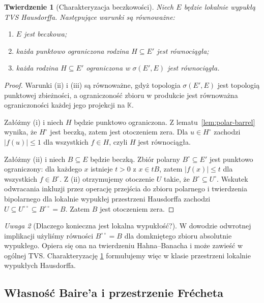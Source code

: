 \documentclass[11pt,a4paper]{article}
\numberwithin{equation}{section}
\theoremstyle{plain}
\newtheorem{twierdzenie}{Twierdzenie}[section]
\theoremstyle{definition}
\theoremstyle{remark}
\newtheorem{uwaga}[twierdzenie]{Uwaga}
\newcommand{\K}{\mathbb K}
\begin{document}
\begin{twierdzenie}[Charakteryzacja beczkowości]\label{thm:barrelled-char}
Niech $E$ będzie lokalnie wypukłą TVS Hausdorffa.
Następujące warunki są równoważne:
\begin{enumerate}[label=\textup{(\roman*)}]
\item $E$ jest beczkowa;
\item każda punktowo ograniczona rodzina $H\subseteq E'$
      jest równociągła;
\item każda rodzina $H\subseteq E'$ ograniczona w
      $\sigma(E',E)$ jest równociągła.
\end{enumerate}
\end{twierdzenie}
\begin{proof}
Warunki (ii) i (iii) są równoważne, gdyż topologia
$\sigma(E',E)$ jest topologią punktowej zbieżności,
a ograniczoność zbioru w produkcie jest równoważna
ograniczoności każdej jego projekcji na $\K$.

Załóżmy (i) i niech $H$ będzie punktowo ograniczona.
Z lematu~\ref{lem:polar-barrel} wynika, że $H^\circ$
jest beczką, zatem jest otoczeniem zera. Dla
$u\in H^\circ$ zachodzi $|f(u)|\le1$ dla wszystkich
$f\in H$, czyli $H$ jest równociągła.

Załóżmy (ii) i niech $B\subseteq E$ będzie beczką.
Zbiór polarny $B^\circ\subseteq E'$ jest punktowo ograniczony:
dla każdego $x$ istnieje $t>0$ z $x\in tB$, zatem
$|f(x)|\le t$ dla wszystkich $f\in B^\circ$.
Z (ii) otrzymujemy otoczenie $U$ takie, że
$B^\circ\subseteq U^\circ$. Wskutek odwracania inkluzji
przez operację przejścia do zbioru polarnego i twierdzenia
bipolarnego dla lokalnie wypukłej przestrzeni Hausdorffa
zachodzi
$U\subseteq U^{\circ\circ}\subseteq B^{\circ\circ}=B$.
Zatem $B$ jest otoczeniem zera.
\end{proof}

\begin{uwaga}[Dlaczego konieczna jest lokalna wypukłość?]
W dowodzie odwrotnej implikacji użyliśmy równości
$B^{\circ\circ}=B$ dla domkniętego zbioru absolutnie
wypukłego. Opiera się ona na twierdzeniu Hahna--Banacha
i może zawieść w ogólnej TVS. Charakteryzację
\ref{thm:barrelled-char} formułujemy więc w klasie
przestrzeni lokalnie wypukłych Hausdorffa.
\end{uwaga}

\subsection{Własność Baire'a i przestrzenie Frécheta}
\end{document}

